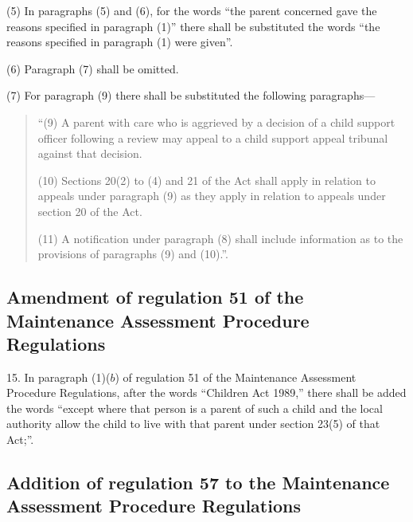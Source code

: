 \documentclass[a4paper]{article}
\begin{document}
(5) In paragraphs (5) and (6), for the words “the parent concerned gave the reasons specified in paragraph (1)” there shall be substituted the words “the reasons specified in paragraph (1) were given”.

(6) Paragraph (7) shall be omitted.

(7) For paragraph (9) there shall be substituted the following paragraphs---
\begin{quotation}
“(9) A parent with care who is aggrieved by a decision of a child support officer following a review may appeal to a child support appeal tribunal against that decision.

(10) Sections 20(2) to (4) and 21 of the Act shall apply in relation to appeals under paragraph (9) as they apply in relation to appeals under section 20 of the Act.

(11) A notification under paragraph (8) shall include information as to the provisions of paragraphs (9) and (10).”.
\end{quotation}

\subsection[15. Amendment of regulation 51 of the Maintenance Assessment Procedure Regulations]{Amendment of regulation 51 of the Maintenance Assessment Procedure Regulations}

15.  In paragraph (1)($b$) of regulation 51 of the Maintenance Assessment Procedure Regulations, after the words “Children Act 1989,” there shall be added the words “except where that person is a parent of such a child and the local authority allow the child to live with that parent under section 23(5) of that Act;”.

\subsection[16. Addition of regulation 57 to the Maintenance Assessment Procedure Regulations]{Addition of regulation 57 to the Maintenance Assessment Procedure Regulations}
\end{document}
